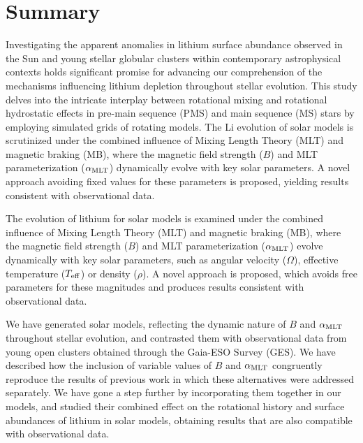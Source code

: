 %

\chapter{Summary}

Investigating the apparent anomalies in lithium surface abundance observed in the Sun and young stellar globular clusters within contemporary astrophysical contexts holds significant promise for advancing our comprehension of the mechanisms influencing lithium depletion throughout stellar evolution. This study delves into the intricate interplay between rotational mixing and rotational hydrostatic effects in pre-main sequence (PMS) and main sequence (MS) stars by employing simulated grids of rotating models. The Li evolution of solar models is scrutinized under the combined influence of Mixing Length Theory (MLT) and magnetic braking (MB), where the magnetic field strength ($B$) and MLT parameterization ($\alpha_{\mathrm{MLT}}$) dynamically evolve with key solar parameters. A novel approach avoiding fixed values for these parameters is proposed, yielding results consistent with observational data.\par

The evolution of lithium for solar models is examined under the combined influence of Mixing Length Theory (MLT) and magnetic braking (MB), where the magnetic field strength ($B$) and MLT parameterization ($\alpha_{\mathrm{MLT}}$) evolve dynamically with key solar parameters, such as angular velocity ($\Omega$), effective temperature ($T_{\mathrm{eff}}$) or density ($\rho$). A novel approach is proposed, which avoids free parameters for these magnitudes and produces results consistent with observational data.

We have generated solar models, reflecting the dynamic nature of $B$ and $\alpha_{\mathrm{MLT}}$ throughout stellar evolution, and contrasted them with observational data from young open clusters obtained through the Gaia-ESO Survey (GES). We have described how the inclusion of variable values of $B$ and $\alpha_{\mathrm{MLT}}$ congruently reproduce the results of previous work in which these alternatives were addressed separately. We have gone a step further by incorporating them together in our models, and studied their combined effect on the rotational history and surface abundances of lithium in solar models, obtaining results that are also compatible with observational data.

